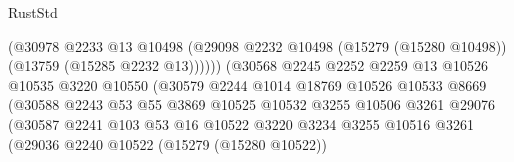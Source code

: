 \begin{lexlean}{RustStd}
\begin{coremodule}
                                          (@30978
                                            @2233
                                            @13
                                            @10498
                                            (@29098
                                              @2232
                                              @10498
                                              (@15279 (@15280 @10498))
                                              (@13759 (@15285 @2232 @13))))))
                                      (@30568
                                        @2245
                                        @2252
                                        @2259
                                        @13
                                        @10526
                                        @10535
                                        @3220
                                        @10550
                                        (@30579
                                          @2244
                                          @1014
                                          @18769
                                          @10526
                                          @10533
                                          @8669
                                          (@30588
                                            @2243
                                            @53
                                            @55
                                            @3869
                                            @10525
                                            @10532
                                            @3255
                                            @10506
                                            @3261
                                            @29076
                                            (@30587
                                              @2241
                                              @103
                                              @53
                                              @16
                                              @10522
                                              @3220
                                              @3234
                                              @3255
                                              @10516
                                              @3261
                                              (@29036
                                                @2240
                                                @10522
                                                (@15279 (@15280 @10522))

\end{coremodule}
\end{lexlean}
